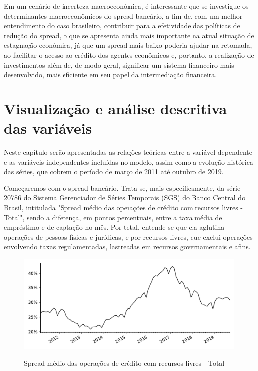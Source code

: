 \documentclass[a4paper,
               article,
               12pt,
               openany,
               oneside,
               english,
               brazil]{abntex2}
\numberwithin{equation}{section}
\begin{document}
    Em um cenário de incerteza macroeconômica, é interessante que se investigue os determinantes macroeconômicos do spread bancário, a fim de, com um melhor entendimento do caso brasileiro, contribuir para a efetividade das políticas de redução do spread, o que se apresenta ainda mais importante na atual situação de estagnação econômica, já que um spread mais baixo poderia ajudar na retomada, ao facilitar o acesso ao crédito dos agentes econômicos e, portanto, a realização de investimentos \cite[p.~8]{manhica12} além de, de modo geral, significar um sistema financeiro mais desenvolvido, mais eficiente em seu papel da intermediação financeira.

\section{Visualização e análise descritiva das variáveis}

    Neste capítulo serão apresentadas as relações teóricas entre a variável dependente e as variáveis independentes incluídas no modelo, assim como a evolução histórica das séries, que cobrem o período de março de 2011 até outubro de 2019.

    Começaremos com o spread bancário. Trata-se, mais especificamente, da série 20786 do Sistema Gerenciador de Séries Temporais (SGS) do Banco Central do Brasil, intitulada "Spread médio das operações de crédito com recursos livres - Total", sendo a diferença, em pontos percentuais, entre a taxa média de empréstimo e de captação no mês. Por total, entende-se que ela aglutina operações de pessoas físicas e jurídicas, e por recursos livres, que exclui operações envolvendo taxas regulamentadas, lastreadas em recursos governamentais e afins.

    \begin{figure}[h]
        \centering
        \caption{Spread médio das operações de crédito com recursos livres - Total}
        \includegraphics[width=\textwidth, scale=0.75]{spread.pdf}
        \label{spread}
    \end{figure}
\end{document}
